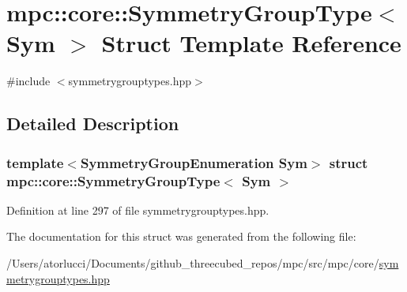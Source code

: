 \hypertarget{structmpc_1_1core_1_1_symmetry_group_type}{}\section{mpc\+:\+:core\+:\+:Symmetry\+Group\+Type$<$ Sym $>$ Struct Template Reference}
\label{structmpc_1_1core_1_1_symmetry_group_type}


{\ttfamily \#include $<$symmetrygrouptypes.\+hpp$>$}



\subsection{Detailed Description}
\subsubsection*{template$<$Symmetry\+Group\+Enumeration Sym$>$\newline
struct mpc\+::core\+::\+Symmetry\+Group\+Type$<$ Sym $>$}



Definition at line 297 of file symmetrygrouptypes.\+hpp.



The documentation for this struct was generated from the following file\+:\begin{DoxyCompactItemize}
\item 
/\+Users/atorlucci/\+Documents/github\+\_\+threecubed\+\_\+repos/mpc/src/mpc/core/\mbox{\hyperlink{symmetrygrouptypes_8hpp}{symmetrygrouptypes.\+hpp}}\end{DoxyCompactItemize}
